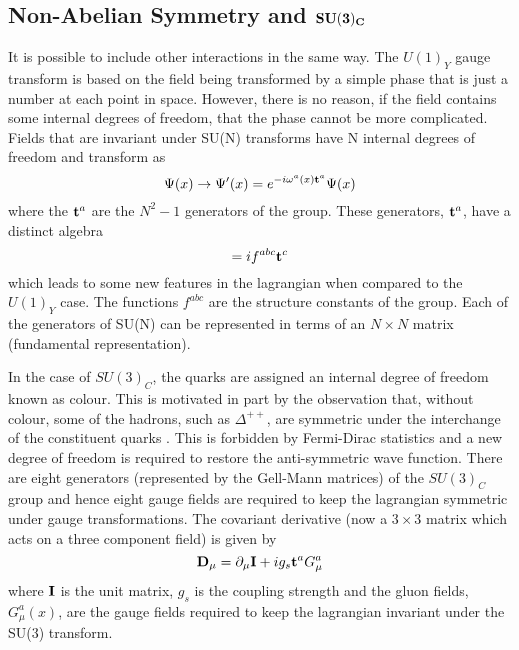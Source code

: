  \subsection{Non-Abelian Symmetry and $\bold{SU(3)_C}$}
 
 It is possible to include other interactions in the same way. The $U(1)_Y$ gauge transform is based on the field being transformed by a simple phase that is just a number at each point in space. However, there is no reason, if the field contains some internal degrees of freedom, that the phase cannot be more complicated. Fields that are invariant under SU(N) transforms have N internal degrees of freedom and transform as
 \begin{equation}
\Psi(x) \rightarrow \Psi^{\prime}(x) = e^{-i\omega^a(x) \bold{t}^a} \Psi(x)
\end{equation} 
 where the $\bold{t}^a$ are the $N^2 -  1$ generators of the group. These generators, $\bold{t}^a$, have a distinct algebra 
\begin{equation}
[\bold{t}^a,\bold{t}^b] = if^{abc}\bold{t}^c
\end{equation} 
which leads to some new features in the lagrangian when compared to the $U(1)_Y$ case. The functions $f^{abc}$ are the structure constants of the group. Each of the generators of SU(N) can be represented in terms of an $N\times N$ matrix (fundamental representation).  
 
In the case of $SU(3)_C$, the quarks are assigned an internal degree of freedom known as colour. This is motivated in part by the observation that, without colour,  some of the hadrons, such as $\Delta^{++}$, are symmetric under the interchange of the constituent quarks \cite{Halzen:1984mc}. This is forbidden by Fermi-Dirac statistics and a new degree of freedom is required to restore the anti-symmetric wave function. There are eight generators (represented by the Gell-Mann matrices) of the $SU(3)_C$ group and hence eight gauge fields are required to keep the lagrangian symmetric under gauge  transformations. The covariant derivative (now a $3\times3$ matrix which acts on a three component field) is given by
 \begin{equation}
 \bold{D}_{\mu} = \partial_{\mu}\bold{I} + ig_s \bold{t}^a G^a_{\mu}
 \end{equation}
 where $\bold{I}$ is the unit matrix, $g_s$ is the coupling strength and the gluon fields, $G^a_{\mu}(x)$, are the gauge fields 
required to keep the lagrangian invariant under the SU(3) transform.

